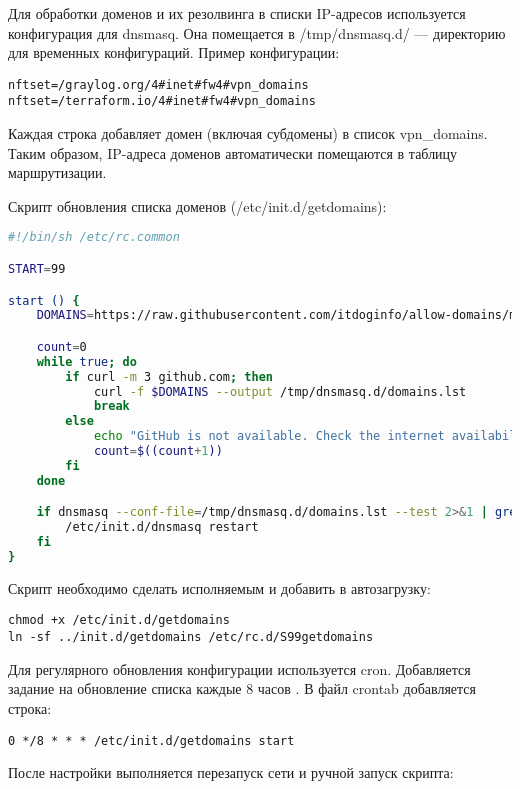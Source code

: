 Для обработки доменов и их резолвинга в списки IP-адресов используется конфигурация для dnsmasq. Она помещается в /tmp/dnsmasq.d/ — директорию для временных конфигураций. Пример конфигурации:

\begin{lstlisting}[frame=rlbt]
nftset=/graylog.org/4#inet#fw4#vpn_domains
nftset=/terraform.io/4#inet#fw4#vpn_domains
\end{lstlisting}

Каждая строка добавляет домен (включая субдомены) в список vpn\_domains. Таким образом, IP-адреса доменов автоматически помещаются в таблицу маршрутизации.

Скрипт обновления списка доменов (/etc/init.d/getdomains):

\begin{lstlisting}[frame=rlbt,language=bash]
#!/bin/sh /etc/rc.common

START=99

start () {
    DOMAINS=https://raw.githubusercontent.com/itdoginfo/allow-domains/main/Russia/inside-dnsmasq-nfset.lst

    count=0
    while true; do
        if curl -m 3 github.com; then
            curl -f $DOMAINS --output /tmp/dnsmasq.d/domains.lst
            break
        else
            echo "GitHub is not available. Check the internet availability [$count]"
            count=$((count+1))
        fi
    done

    if dnsmasq --conf-file=/tmp/dnsmasq.d/domains.lst --test 2>&1 | grep -q "syntax check OK"; then
        /etc/init.d/dnsmasq restart
    fi
}
\end{lstlisting}

Скрипт необходимо сделать исполняемым и добавить в автозагрузку:

\begin{lstlisting}[frame=rlbt]
chmod +x /etc/init.d/getdomains
ln -sf ../init.d/getdomains /etc/rc.d/S99getdomains
\end{lstlisting}

Для регулярного обновления конфигурации используется cron. Добавляется задание на обновление списка каждые 8 часов \cite{cron}. В файл crontab добавляется строка:

\begin{lstlisting}[frame=rlbt]
0 */8 * * * /etc/init.d/getdomains start
\end{lstlisting}

После настройки выполняется перезапуск сети и ручной запуск скрипта:

